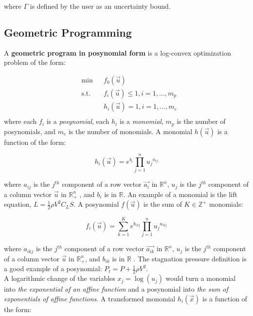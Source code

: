 where $\Gamma$ is defined by the user as an uncertainty bound.

\subsection{Geometric Programming}

A \textbf{geometric program in posynomial form} is a log-convex optimization problem of the form:

\begin{equation}
\begin{aligned}
	& \text{min} && f_0 \left(\vec{u}\right) \\
	& \text{s.t.} && f_i \left(\vec{u}\right) \leq 1, i = 1,...,m_p\\
	& && h_i \left(\vec{u}\right) = 1, i = 1, ...,m_e\\
\end{aligned}
\label{GP_standard}
\end{equation}
where each $f_i$ is a {\em posynomial}, each $h_i$ is a {\em monomial}, $m_p$ is the number of posynomials,
and $m_e$ is the number of monomials. A monomial $h(\vec{u})$ is a function of the form:

\begin{displaymath}
	h_i(\vec{u}) = e^{b_i}\textstyle{\prod}_{j=1}^{n}{u_j}^{a_{ij}}
\end{displaymath}

where $a_{ij}$ is the $j^{th}$ component of a row vector $\vec{a_i}$ in $\mathbb{R}^n$,
$u_j$ is the $j^{th}$ component of a column vector $\vec{u}$ in $\mathbb{R}^n_+$ ,
and $b_i$ is in $\mathbb{R}$. An example of a monomial is the lift equation,
$L = \frac{1}{2}\rho V^2 C_L S$.
A posynomial $f(\vec{u})$ is the sum of $K \in \mathbb{Z}^+$ monomials:

\begin{displaymath}
	f_i(\vec{u}) = \textstyle{\sum_{k=1}^{K}}e^{b_{ikj}}\prod_{j=1}^{n}{u_j}^{a_{ikj}}
\end{displaymath}

where $a_{ikj}$ is the $j^{th}$ component of a row vector $\vec{a_{ik}}$ in $\mathbb{R}^n$,
$u_j$ is the $j^{th}$ component of a column vector $\vec{u}$ in $\mathbb{R}^n_+$, and $b_{ik}$
is in $\mathbb{R}$ \cite{Boyd2007}. The stagnation pressure definition is a good example of a posynomial:
$P_t = P + \frac{1}{2} \rho V^2$.\\

A logarithmic change of the variables $x_j = \log(u_j)$ would turn a monomial into
{\em  the exponential of an affine function} and a posynomial into
{\em the sum of exponentials of affine functions}. A transformed monomial $h_i(\vec{x})$ is a function of the form:

